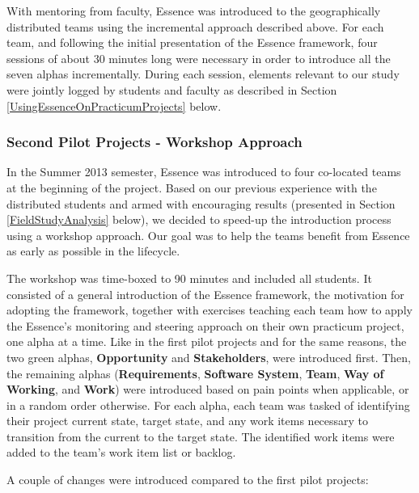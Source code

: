 With mentoring from faculty, Essence was introduced to the geographically distributed teams using the incremental approach described above. For each team, and following the initial presentation of the Essence framework, four sessions of about 30 minutes long were necessary in order to introduce all the seven alphas incrementally. During each session, elements relevant to our study were jointly logged by students and faculty as described in Section \ref{UsingEssenceOnPracticumProjects} below.

\subsubsection{Second Pilot Projects - Workshop Approach}
In the Summer 2013 semester, Essence was introduced to four co-located teams at the beginning of the project. Based on our previous experience with the distributed students and armed with encouraging results (presented in Section \ref{FieldStudyAnalysis} below), we decided to speed-up the introduction process using a workshop approach. Our goal was to help the teams benefit from Essence as early as possible in the lifecycle.

The workshop was time-boxed to 90 minutes and included all students. It consisted of a general introduction of the Essence framework, the motivation for adopting the framework, together with exercises teaching each team how to apply the Essence's monitoring and steering approach on their own practicum project, one alpha at a time. Like in the first pilot projects and for the same reasons, the two green  alphas, \textbf{Opportunity} and \textbf{Stakeholders}, were introduced first. Then, the remaining alphas (\textbf{Requirements}, \textbf{Software System}, \textbf{Team}, \textbf{Way of Working}, and \textbf{Work}) were introduced based on pain points when applicable, or in a random order otherwise. For each alpha, each team was tasked of identifying their project current state, target state, and any work items necessary to transition from the current to the target state. The identified work items were added to the team's work item list or backlog.

A couple of changes were introduced compared to the first pilot projects:

